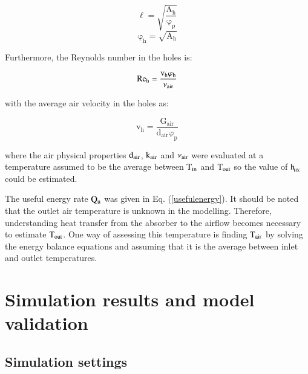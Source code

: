 \vspace{-0.75cm}
\begin{equation}
\mathrm{\ell = \sqrt{\frac{{{\mathrm{A_h}}}}{\varphi_{\mathrm{p}}}}}
\label{phole}
\end{equation}
\vspace*{-0.25cm}
\begin{equation}
\mathrm{{\varphi_h} = \sqrt{{\mathrm{A_h}}}}
\label{dhole}
\end{equation}


Furthermore, the Reynolds number in the holes is:

\vspace{-0.75cm}
\begin{equation}
\mathrm{{{\mathop{\rm Re}\nolimits} _h} = \frac{{{v_h}{\varphi_h}}}{{{\mathlarger{\nu} _{air}}}}}
\label{reynoldshole}
\end{equation}

\noindent with the average air velocity in the holes as:

\vspace{-0.75cm}
\begin{equation}
\mathrm{{v_h} = \frac{{{G_{air}}}}{{{d_{air}}\varphi_p}}}
\label{vh}
\end{equation}

\noindent where the air physical properties $\rm{d_{air}}$, $\rm{k_{air}}$ and $\rm{\nu_{air}}$ were evaluated at a temperature assumed to be the average between $\rm{T_{in}}$ and $\rm{T_{out}}$ so the value of $\rm{h_{\!_{HX}}}$ could be estimated. 

The useful energy rate $\rm{Q_u}$ was given in Eq. (\ref{usefulenergy}). It should be noted that the outlet air temperature is unknown in the modelling. Therefore, understanding heat transfer from the absorber to the airflow becomes necessary to estimate $\rm{T_{out}}$. One way of assessing this temperature is finding $\rm{T_{air}}$ by solving the energy balance equations and assuming that it is the average between inlet and outlet temperatures.

\section{Simulation results and model validation}

\subsection{Simulation settings}

